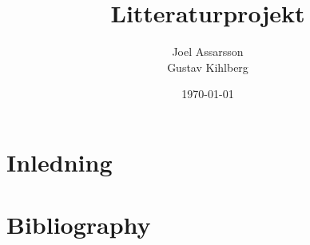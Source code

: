 \documentclass[a4paper]{article}
\begin{document}
\title{Litteraturprojekt}
\author{
\begin{tabular}[t]{c}
\large Joel Assarsson\\Gustav Kihlberg\\
\date{\today}
\end{tabular}
}
\maketitle

\newpage
\section{Inledning}

\newpage
\section{Bibliography}
 
% 
{}
\end{document}
